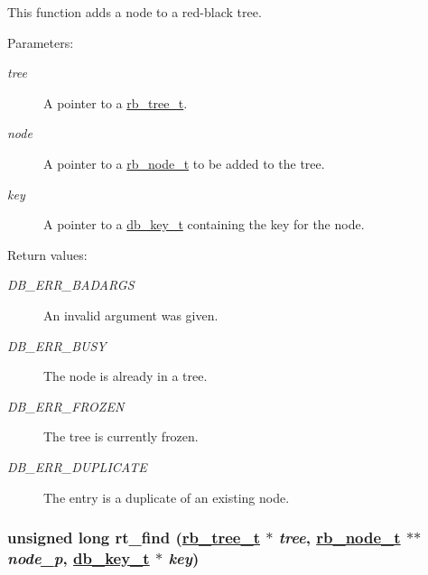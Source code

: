 This function adds a node to a red-black tree.\begin{Desc}
\item[Parameters: ]\par
\begin{description}
\item[{\em 
tree}]A pointer to a \hyperlink{group__dbprim__rbtree_a0}{rb\_\-tree\_\-t}. \item[{\em 
node}]A pointer to a \hyperlink{group__dbprim__rbtree_a1}{rb\_\-node\_\-t} to be added to the tree. \item[{\em 
key}]A pointer to a \hyperlink{group__dbprim_a0}{db\_\-key\_\-t} containing the key for the node.\end{description}
\end{Desc}
\begin{Desc}
\item[Return values: ]\par
\begin{description}
\item[{\em 
DB\_\-ERR\_\-BADARGS}]An invalid argument was given. \item[{\em 
DB\_\-ERR\_\-BUSY}]The node is already in a tree. \item[{\em 
DB\_\-ERR\_\-FROZEN}]The tree is currently frozen. \item[{\em 
DB\_\-ERR\_\-DUPLICATE}]The entry is a duplicate of an existing node. \end{description}
\end{Desc}
\hypertarget{group__dbprim__rbtree_a9}{
\subsubsection[rt\_\-find]{\setlength{\rightskip}{0pt plus 5cm}unsigned long rt\_\-find (\hyperlink{group__dbprim__rbtree_a0}{rb\_\-tree\_\-t} $\ast$ {\em tree}, \hyperlink{group__dbprim__rbtree_a1}{rb\_\-node\_\-t} $\ast$$\ast$ {\em node\_\-p}, \hyperlink{group__dbprim_a0}{db\_\-key\_\-t} $\ast$ {\em key})}}
\label{group__dbprim__rbtree_a9}


